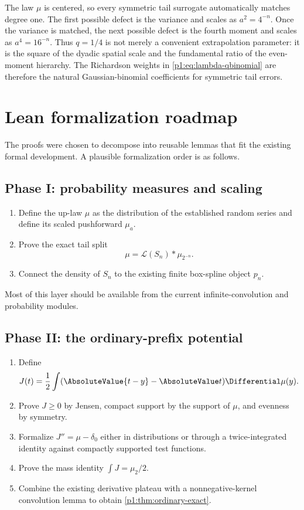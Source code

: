 \documentclass[11pt]{article}
\numberwithin{equation}{section}
\theoremstyle{definition}
\theoremstyle{remark}
\begin{document}
The law $\mu$ is centered, so every symmetric tail surrogate automatically matches degree one.  The first possible defect is the variance and scales as $a^2=4^{-n}$.  Once the variance is matched, the next possible defect is the fourth moment and scales as $a^4=16^{-n}$.  Thus $q=1/4$ is not merely a convenient extrapolation parameter: it is the square of the dyadic spatial scale and the fundamental ratio of the even-moment hierarchy.  The Richardson weights in \eqref{p1:eq:lambda-qbinomial} are therefore the natural Gaussian-binomial coefficients for symmetric tail errors.

\section{Lean formalization roadmap}
\label{p1:sec:formalization}

The proofs were chosen to decompose into reusable lemmas that fit the existing formal development.  A plausible formalization order is as follows.

\subsection{Phase I: probability measures and scaling}

\begin{enumerate}
\item Define the up-law $\mu$ as the distribution of the established random series and define its scaled pushforward $\mu_a$.
\item Prove the exact tail split
\[
 \mu=\mathcal L(S_n)*\mu_{2^{-n}}.
\]
\item Connect the density of $S_n$ to the existing finite box-spline object $p_n$.
\end{enumerate}

Most of this layer should be available from the current infinite-convolution and probability modules.

\subsection{Phase II: the ordinary-prefix potential}

\begin{enumerate}
\item Define
\[
 J(t)=\frac12\int(\AbsoluteValue{t-y}-\AbsoluteValue t)\Differential\mu(y).
\]
\item Prove $J\ge0$ by Jensen, compact support by the support of $\mu$, and evenness by symmetry.
\item Formalize $J''=\mu-\delta_0$ either in distributions or through a twice-integrated identity against compactly supported test functions.
\item Prove the mass identity $\int J=\mu_2/2$.
\item Combine the existing derivative plateau with a nonnegative-kernel convolution lemma to obtain \cref{p1:thm:ordinary-exact}.
\end{enumerate}
\end{document}
